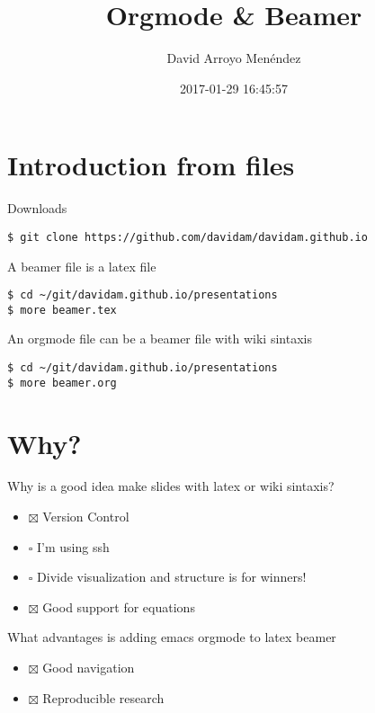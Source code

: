 \documentclass[unicode,presentation,c,squeeze,shrink,10pt]{beamer}
\author{David Arroyo Menéndez}
\date{2017-01-29 16:45:57}
\title{Orgmode \& Beamer}
\begin{document}
\maketitle
\section{Introduction from files}
\label{sec-1}
\begin{frame}[fragile,label=sec-1-1]{Downloads}
 \begin{verbatim}
$ git clone https://github.com/davidam/davidam.github.io
\end{verbatim}
\end{frame}
\begin{frame}[fragile,label=sec-1-2]{A beamer file is a latex file}
 \begin{verbatim}
$ cd ~/git/davidam.github.io/presentations
$ more beamer.tex
\end{verbatim}
\end{frame}
\begin{frame}[fragile,label=sec-1-3]{An orgmode file can be a beamer file with wiki sintaxis}
 \begin{verbatim}
$ cd ~/git/davidam.github.io/presentations
$ more beamer.org
\end{verbatim}
\end{frame}
\section{Why?}
\label{sec-2}
\begin{frame}[label=sec-2-1]{Why is a good idea make slides with latex or wiki sintaxis?}
\begin{itemize}
\item $\boxtimes$ Version Control
\item $\square$ I'm using ssh
\item $\square$ Divide visualization and structure is for winners!
\item $\boxtimes$ Good support for equations
\end{itemize}
\end{frame}

\begin{frame}[label=sec-2-2]{What advantages is adding emacs orgmode to latex beamer}
\begin{itemize}
\item $\boxtimes$ Good navigation
\item $\boxtimes$ Reproducible research
\end{itemize}
\end{frame}
\end{document}
